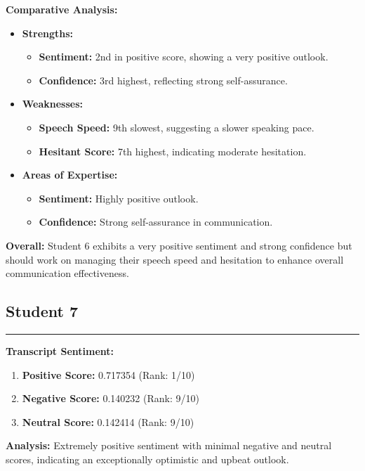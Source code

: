 \documentclass{article}
\begin{document}
\textbf{Comparative Analysis:}
\begin{itemize}
    \item \textbf{Strengths:}
    \begin{itemize}
        \item \textbf{Sentiment:} 2nd in positive score, showing a very positive outlook.
        \item \textbf{Confidence:} 3rd highest, reflecting strong self-assurance.
    \end{itemize}
    \item \textbf{Weaknesses:}
    \begin{itemize}
        \item \textbf{Speech Speed:} 9th slowest, suggesting a slower speaking pace.
        \item \textbf{Hesitant Score:} 7th highest, indicating moderate hesitation.
    \end{itemize}
    \item \textbf{Areas of Expertise:}
    \begin{itemize}
        \item \textbf{Sentiment:} Highly positive outlook.
        \item \textbf{Confidence:} Strong self-assurance in communication.
    \end{itemize}
\end{itemize}

\textbf{Overall:} Student 6 exhibits a very positive sentiment and strong confidence but should work on managing their speech speed and hesitation to enhance overall communication effectiveness.


\subsection{Student 7}
\begin{center}
    \color{green}\rule{1\linewidth}{0.7mm}
\end{center}

\large{\textbf{Transcript Sentiment:}}
\begin{tcolorbox}[colback=blue!5!white,colframe=blue!75!black,title=Sentiment Breakdown]
    \begin{enumerate}
        \item \textbf{Positive Score:} \textcolor{green!70!black}{0.717354} (Rank: 1/10)
        \item \textbf{Negative Score:} \textcolor{red!70!black}{0.140232} (Rank: 9/10)
        \item \textbf{Neutral Score:} \textcolor{blue!70!black}{0.142414} (Rank: 9/10)
    \end{enumerate}
\end{tcolorbox}
    \textbf{Analysis:} Extremely positive sentiment with minimal negative and neutral scores, indicating an exceptionally optimistic and upbeat outlook.
\end{document}
